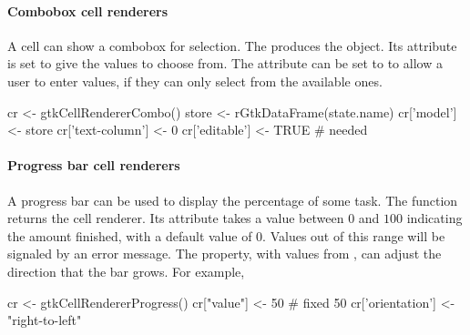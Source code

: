 \paragraph{Combobox cell renderers}
A cell can show a combobox for selection. The
 produces the object. Its
 attribute is set to give the values to choose from. The
attribute  can be set to  to allow a user
to enter values, if  they can only select from the
available ones. 

\begin{Schunk}
\begin{Sinput}
 cr <- gtkCellRendererCombo()
 store <- rGtkDataFrame(state.name)
 cr['model'] <- store
 cr['text-column'] <- 0
 cr['editable'] <- TRUE                  # needed
\end{Sinput}
\end{Schunk}

\paragraph{Progress bar cell renderers}
A progress bar can be used to display the percentage of some task. The
 function returns the cell
renderer. Its  attribute takes a value between $0$ and
$100$ indicating the amount finished, with a default value of
$0$. Values out of this range will be signaled by an error message.  The
 property, with values from
, can adjust the direction that the
bar grows.  For example,

\begin{Schunk}
\begin{Sinput}
 cr <- gtkCellRendererProgress()
 cr["value"] <- 50                       # fixed 50%
 cr['orientation'] <- "right-to-left"
\end{Sinput}
\end{Schunk}

